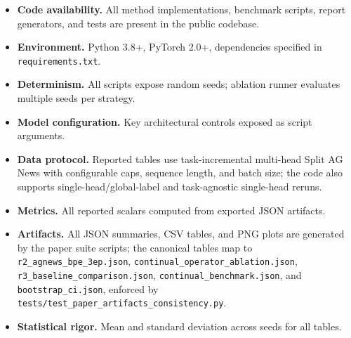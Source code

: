 \documentclass[11pt,a4paper]{article}
\theoremstyle{definition}
\begin{document}
\begin{itemize}
    \item \textbf{Code availability.} All method implementations, benchmark scripts, report generators, and tests are present in the public codebase.
    \item \textbf{Environment.} Python 3.8+, PyTorch 2.0+, dependencies specified in \texttt{requirements.txt}.
    \item \textbf{Determinism.} All scripts expose random seeds; ablation runner evaluates multiple seeds per strategy.
    \item \textbf{Model configuration.} Key architectural controls exposed as script arguments.
    \item \textbf{Data protocol.} Reported tables use task-incremental multi-head Split AG News with configurable caps, sequence length, and batch size; the code also supports single-head/global-label and task-agnostic single-head reruns.
    \item \textbf{Metrics.} All reported scalars computed from exported JSON artifacts.
    \item \textbf{Artifacts.} All JSON summaries, CSV tables, and PNG plots are generated by the paper suite scripts; the canonical tables map to \texttt{r2\_agnews\_bpe\_3ep.json}, \texttt{continual\_operator\_ablation.json}, \texttt{r3\_baseline\_comparison.json}, \texttt{continual\_benchmark.json}, and \texttt{bootstrap\_ci.json}, enforced by \texttt{tests/test\_paper\_artifacts\_consistency.py}.
    \item \textbf{Statistical rigor.} Mean and standard deviation across seeds for all tables.
\end{itemize}
\end{document}

